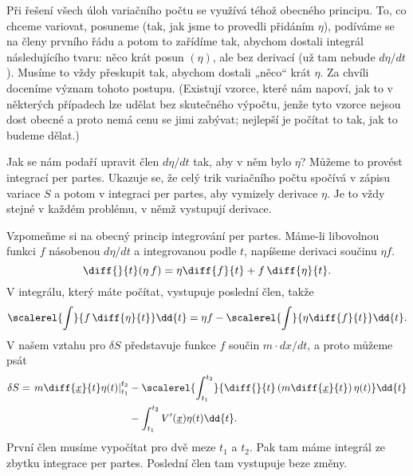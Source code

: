     Při řešení všech úloh variačního počtu se využívá téhož obecného principu. To, co chceme
    variovat, posuneme (tak, jak jsme to provedli přidáním \(\eta\)), podíváme se na členy prvního
    řádu a potom to zařídíme tak, abychom dostali integrál následujícího tvaru: něco krát posun
    \((\eta)\), ale bez derivací (už tam nebude \(d\eta/dt\)). Musíme to vždy přeskupit tak, abychom
    dostali „něco“ krát \(\eta\). Za chvíli doceníme význam tohoto postupu. (Existují vzorce, které
    nám napoví, jak to v některých případech lze udělat bez skutečného výpočtu, jenže tyto vzorce
    nejsou dost obecné a proto nemá cenu se jimi zabývat; nejlepší je počítat to tak, jak to budeme
    dělat.)

    Jak se nám podaří upravit člen \(d\eta/dt\) tak, aby v něm bylo \(\eta\)? Můžeme to provést
    integrací per partes. Ukazuje se, že celý trik variačního počtu spočívá v zápisu variace \(S\) a
    potom v integraci per partes, aby vymizely derivace \(\eta\). Je to vždy stejné v každém
    problému, v němž vystupují derivace. 
    
    Vzpomeňme si na obecný princip integrování per partes. Máme-li libovolnou funkci \(f\) násobenou
    \(d\eta/dt\) a integrovanou podle \(t\), napíšeme derivaci součinu \(\eta f\).
    \begin{equation*}
      \diff{}{t}(\eta\,f) = \eta\diff{f}{t} + f\,\diff{\eta}{t}.
    \end{equation*}  
    V integrálu, který máte počítat, vystupuje poslední člen, takže
    \begin{equation*}
      \scalerel{\int}{f\,\diff{\eta}{t}}\dd{t} = \eta f - \scalerel{\int}{\eta\diff{f}{t}}\dd{t}.
    \end{equation*}  
    V našem vztahu pro \(\delta S\) představuje funkce \(f\) součin \(m\cdot dx/dt\), a proto můžeme
    psát
    \begin{align*}
      \delta S = \left.m\diff{\underline{x}}{t}\eta(t)\right\rvert^{t_2}_{t_1} 
               &- \scalerel{\int^{t_2}_{t_1}}{\diff{}{t}
                    \left(m\diff{\underline{x}}{t}\right)\eta(t)
                  }\dd{t}   \\
               &- \int^{t_2}_{t_1} V'(\underline{x})\eta(t)\dd{t}.
    \end{align*} 
    První člen musíme vypočítat pro dvě meze \(t_1\) a \(t_2\). Pak tam máme integrál ze zbytku
    integrace per partes. Poslední člen tam vystupuje beze změny.

